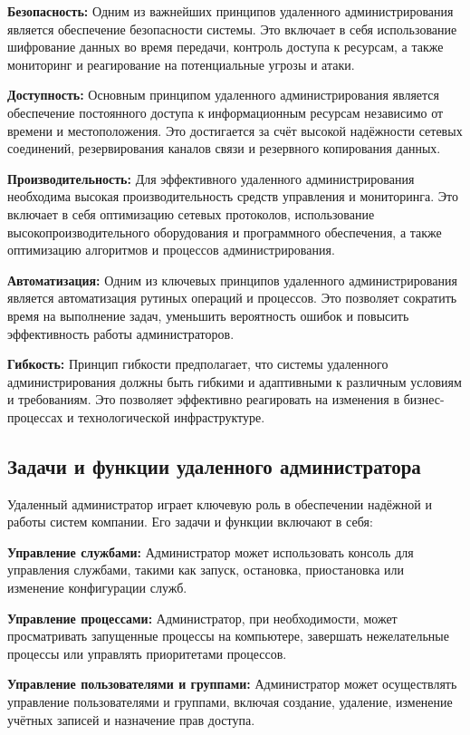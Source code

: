 \textbf{Безопасность:} Одним из важнейших принципов удаленного администрирования является обеспечение безопасности системы. Это включает в себя использование шифрование данных во время передачи, контроль доступа к ресурсам, а также мониторинг и реагирование на потенциальные угрозы и атаки.

\textbf{Доступность:} Основным принципом удаленного администрирования является обеспечение постоянного доступа к информационным ресурсам независимо от времени и местоположения. Это достигается за счёт высокой надёжности сетевых соединений, резервирования каналов связи и резервного копирования данных.

\textbf{Производительность:} Для эффективного удаленного администрирования необходима высокая производительность средств управления и мониторинга. Это включает в себя оптимизацию сетевых протоколов, использование высокопроизводительного оборудования и программного обеспечения, а также оптимизацию алгоритмов и процессов администрирования.

\textbf{Автоматизация:} Одним из ключевых принципов удаленного администрирования является автоматизация рутиных операций и процессов. Это позволяет сократить время на выполнение задач, уменьшить вероятность ошибок и повысить эффективность работы администраторов.

\textbf{Гибкость:} Принцип гибкости предполагает, что системы удаленного администрирования должны быть гибкими и адаптивными к различным условиям и требованиям. Это позволяет эффективно реагировать на изменения в бизнес-процессах и технологической инфраструктуре.

\subsection{Задачи и функции удаленного администратора}

Удаленный администратор играет ключевую роль в обеспечении надёжной и работы систем компании. Его задачи и функции включают в себя:

\textbf{Управление службами:} Администратор может использовать консоль для управления службами, такими как запуск, остановка, приостановка или изменение конфигурации служб.

\textbf{Управление процессами:} Администратор, при необходимости, может просматривать запущенные процессы на компьютере, завершать нежелательные процессы или управлять приоритетами процессов.

\textbf{Управление пользователями и группами:} Администратор может осуществлять управление пользователями и группами, включая создание, удаление, изменение учётных записей и назначение прав доступа.

